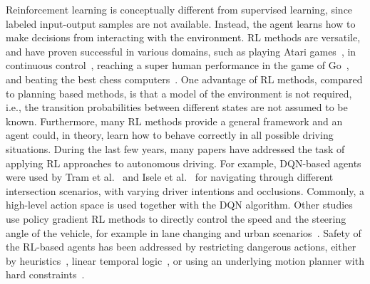 Reinforcement learning is conceptually different from supervised learning, since labeled input-output samples are not available. Instead, the agent learns how to make decisions from interacting with the environment.
RL methods are versatile, and have proven successful in various domains, such as playing Atari games~\cite{Mnih2015}, in continuous control~\cite{Lillicrap2015}, reaching a super human performance in the game of Go~\cite{Silver2017}, and beating the best chess computers~\cite{Silver2017chess}. One advantage of RL methods, compared to planning based methods, is that a model of the environment is not required, i.e., the transition probabilities between different states are not assumed to be known. Furthermore, many RL methods provide a general framework and an agent could, in theory, learn how to behave correctly in all possible driving situations.
%
During the last few years, many papers have addressed the task of applying RL approaches to autonomous driving. For example, DQN-based agents were used by Tram et al.~\cite{Tram2018} and Isele et al.~\cite{Isele2018} for navigating through different intersection scenarios, with varying driver intentions and occlusions. Commonly, a high-level action space is used together with the DQN algorithm. Other studies use policy gradient RL methods to directly control the speed and the steering angle of the vehicle, for example in lane changing and urban scenarios~\cite{Wang2019_ddpg, Chen2019}.
Safety of the RL-based agents has been addressed by restricting dangerous actions, either by heuristics~\cite{Mukadam2017}, linear temporal logic~\cite{Bouton2019}, or using an underlying motion planner with hard constraints~\cite{Shalev2016}.
%
